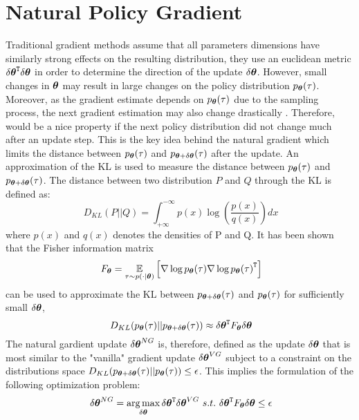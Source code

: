 \vspace{-0.05in}
\section{Natural Policy Gradient}\label{sec:npg}
Traditional gradient methods assume that all parameters dimensions have similarly strong effects on the resulting distribution, \ie they use an euclidean metric $\transpose{\delta\vtheta}\delta\vtheta$ in order to determine the direction of the update $\delta\vtheta$. However, small changes in $\vtheta$ may result in large changes on the policy distribution $p_{\vtheta}(\tau)$. Moreover, as the gradient estimate depends on $p_{\vtheta}(\tau)$ due to the sampling process, the next gradient estimation may also change drastically \citep{deisenroth2013survey}. Therefore, would be a nice property if the next policy distribution did not change much after an update step. This is the key idea behind the natural gradient which limits the distance between $p_{\vtheta}(\tau)$ and $p_{\vtheta+\delta\vtheta}(\tau)$ after the update. An approximation of the \ac{KL} is used to measure the distance between $p_{\vtheta}(\tau)$ and $p_{\vtheta+\delta\vtheta}(\tau)$. The distance between two distribution $P$ and $Q$ through the \acs{KL} is defined as:
\[
\	D_{KL}(P||Q)=\int_{+\infty}^{-\infty}p(x)\log(\frac{p(x)}{q(x)})dx
\]
where $p(x)$ and $q(x)$ denotes the densities of P and Q. It has been shown that the Fisher information matrix
\[
\ F_{\vtheta}=\EVV[\tau \sim p(\cdot|\vtheta)]{\score{\vtheta}{\tau}\transpose{\score{\vtheta}{\tau}}}
\]
can be used to approximate the \acs{KL} between $p_{\vtheta+\delta\vtheta}(\tau)$ and $p_{\vtheta}(\tau)$ for sufficiently small $\delta\vtheta$, \ie
\[
\ D_{KL}(p_{\vtheta}(\tau)||p_{\vtheta+\delta\vtheta}(\tau))\approx\transpose{\delta\vtheta}F_{\vtheta}\delta\vtheta
\]
The natural gardient update $\delta\vtheta^{NG}$ is, therefore, defined as the update $\delta\vtheta$ that is most similar to the "vanilla" gradient update $\delta\vtheta^{VG}$  subject to a constraint  on the distributions space $D_{KL}(p_{\vtheta+\delta\vtheta}(\tau)||p_{\vtheta}(\tau))\le\epsilon$.
This implies the formulation of the following optimization problem:
\[
\ \delta\vtheta^{NG}=\argmax_{\delta\vtheta}\transpose{\delta\vtheta}\delta\vtheta^{VG} ~s.t.  ~\transpose{\delta\vtheta}F_{\vtheta}\delta\vtheta\le\epsilon
\]
